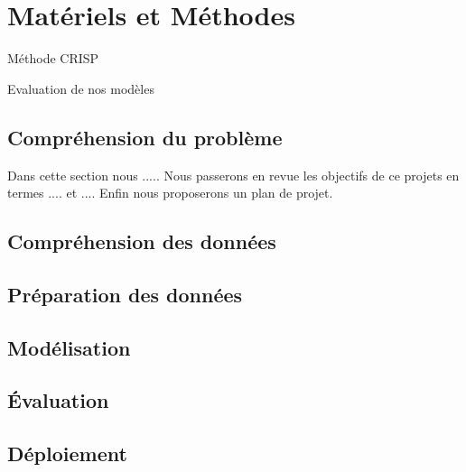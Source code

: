 \chapter{Matériels et Méthodes}

Méthode CRISP\cite{crisp}

Evaluation de nos modèles \cite{plasticc_team_2019_2539456}

\section{Compréhension du problème}

Dans cette section nous .....
Nous passerons en revue les objectifs de ce projets en termes .... et ....
Enfin nous proposerons un plan de projet.


\section{Compréhension des données}
\section{Préparation des données}
\section{Modélisation}
\section{Évaluation}
\section{Déploiement}
